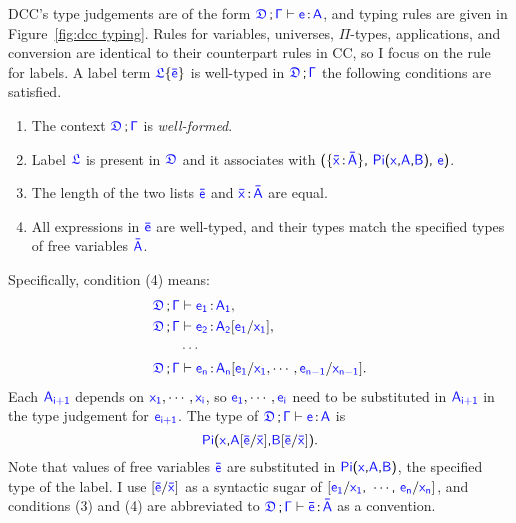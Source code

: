 DCC's type judgements are of the form $\targetcon \vdash \itemtype{e}{A}$, and
typing rules are given in Figure~\ref{fig:dcc typing}. Rules for variables, universes, $\Pi$-types, applications, and conversion are identical to their counterpart rules in CC, so I focus on the rule for labels. A label term $\targetlab{\flabel}{\bar{e}}$ is well-typed in $\targetcon$ the following conditions are satisfied.
\begin{enumerate}
	\item The context $\targetcon$ is \textit{well-formed}.
	\item Label $\target{\flabel}$ is present in $\target{\fdef}$ and it associates with 
		$\textsf{(}\{\itemtype{\bar{x}}{\bar{A}}\}\textsf{,}\ \targetpi{x}{A}{B} \textsf{,}\ \target{e} \textsf{)}$.
	\item The length of the two lists $\target{\bar{e}}$ and $\itemtype{\bar{x}}{\bar{A}}$ are equal. 
	\item All expressions in $\target{\bar{e}}$ are well-typed, and their types match the specified types of free variables $\target{\bar{A}}$. 
\end{enumerate}
Specifically, condition (4) means:
\begin{align*}
	\targetcon &\vdash \itemtype{e_1}{A_1},\\
	\targetcon &\vdash \itemtype{e_2}{A_2}\targetsub{e_1}{x_1},\\
	&\cdots\\
	\targetcon &\vdash \itemtype{e_n}{A_n}[\target{e_1} \slash \target{x_1}, \cdots, \target{e_{n-1}} \slash \target{x_{n-1}}].
\end{align*}
Each $\target{A_{i+1}}$ depends on $\target{x_1}, \cdots, \target{x_i}$, so $\target{e_1}, \cdots, \target{e_i}$ need to be substituted in $\target{A_{i+1}}$ in the type judgement for $\target{e_{i+1}}$. The type of $\targetcon \vdash \itemtype{e}{A}$ is
\begin{equation*}
\target{Pi}\textsf{(}\target{x}\textsf{,} \target{A} \targetsub{\bar{e}}{\bar{x}}\textsf{,} \target{B} \targetsub{\bar{e}}{\bar{x}}\textsf{)}.
\end{equation*}
Note that values of free variables $\target{\bar{e}}$ are substituted in $\targetpi{x}{A}{B}$, the specified type of the label. I use $\targetsub{\bar{e}}{\bar{x}}$ as a syntactic sugar of $[\target{e_1}\slash\target{x_1}\sfcomma \cdots\sfcomma \target{e_n}\slash\target{x_n}]$, and conditions (3) and (4) are abbreviated to $\targetcon \vdash \itemtype{\bar{e}}{\bar{A}}$ as a convention.

